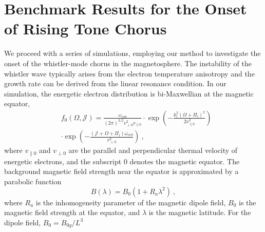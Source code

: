 \documentclass[times,12pt,3p,longtitle]{elsarticle}
\begin{document}
\section{Benchmark Results for the Onset of Rising Tone Chorus}
\label{sec:code}
We proceed with a series of simulations, employing our method to investigate the onset of the whistler-mode chorus
 in the  magnetosphere. The instability of the whistler wave typically arises from the electron temperature anisotropy  \cite{kennel1966a,kennel1966b} and the growth rate can be derived from the linear resonance condition.
In our simulation, the energetic electron distribution is bi-Maxwellian at the magnetic equator, 
\begin{equation}
    \begin{aligned}
        & f_{0}(\Omega, \mathcal{J}) =\frac{\omega_{c e 0}}{(2 \pi)^{3 / 2} v_{ \perp 0}^2 v_{ \| 0}} \cdot \exp \left(-\frac{k_l^2(\Omega+\Pi_i)^2}{2 v_{ \| 0}^2}\right) \\
        &\cdot\exp \left(-\frac{(\mathcal{J}+\Omega+\Pi_i) \omega_{c e 0}}{v_{ \perp 0}^2}\right)~,
        \end{aligned}
\end{equation}
where $v_{ \| 0}$
and $v_{ \perp 0}$ are the
parallel and perpendicular thermal velocity of energetic electrons,
and 
the subscript $0$ denotes the magnetic equator.
The background magnetic field strength near the equator is approximated %
 by a parabolic function \cite{tao2014a}
\begin{equation}
    B(\lambda) = B_0 (1+ R_a \lambda ^2)~,
\end{equation}
where $R_a$ is the inhomogeneity parameter of the magnetic dipole field, $B_0$ is the magnetic field strength at the equator, and $\lambda$ is the magnetic latitude. %
For the dipole field, 
 $   B_0 = B_{0g}/L^3$
\end{document}
